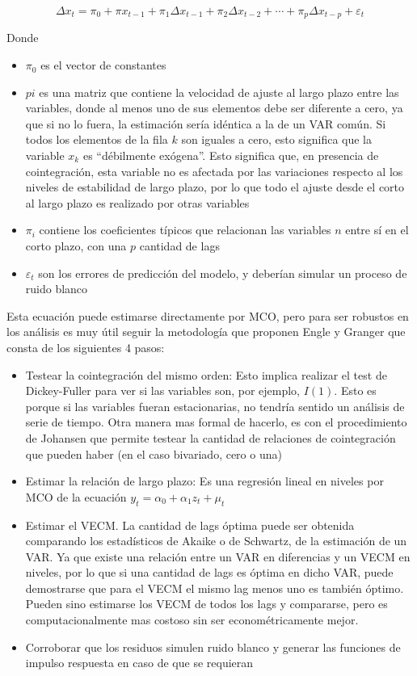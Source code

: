\documentclass[11pt,a4paper]{article}
\begin{document}
$$
\Delta x_{t}=\pi_{0}+\pi x_{t-1}+\pi_{1} \Delta x_{t-1}+\pi_{2} \Delta x_{t-2}+\cdots+\pi_{p} \Delta x_{t-p}+\varepsilon_{t}
$$

Donde 
\begin{itemize}
\item $\pi_{0}$ es el vector de constantes
\item $pi$ es una matriz que contiene la velocidad de ajuste al largo plazo entre las variables, donde al menos uno de sus elementos debe ser diferente a cero, ya que si no lo fuera, la estimación sería idéntica a la de un VAR común. Si todos los elementos de la fila $k$ son iguales a cero, esto significa que la variable $x_k$ es ``débilmente exógena''. Esto significa que, en presencia de cointegración, esta variable no es afectada por las variaciones respecto al los niveles de estabilidad de largo plazo, por lo que todo el ajuste desde el corto al largo plazo es realizado por otras variables 
\item $\pi_{i}$ contiene los coeficientes típicos que relacionan las variables $n $ entre sí en el corto plazo, con una $p$ cantidad de lags 
\item $\varepsilon_{t} $ son los errores de predicción del modelo, y deberían simular un proceso de ruido blanco
\end{itemize}

Esta ecuación puede estimarse directamente por MCO, pero para ser robustos en los análisis es muy útil seguir la metodología que proponen Engle y Granger que consta de los siguientes 4 pasos:
\begin{itemize}
\item Testear la cointegración del mismo orden: Esto implica realizar el test de Dickey-Fuller para ver si las variables son, por ejemplo, $I(1) $. Esto es porque si las variables fueran estacionarias, no tendría sentido un análisis de serie de tiempo. Otra manera mas formal de hacerlo, es con el procedimiento de Johansen que permite testear la cantidad de relaciones de cointegración que pueden haber (en el caso bivariado, cero o una)
\item Estimar la relación de largo plazo: Es una regresión lineal en niveles por MCO de la ecuación $y_t=\alpha_0 +\alpha_1 z_t + \mu_t $
\item Estimar el VECM. La cantidad de lags óptima puede ser obtenida comparando los estadísticos de Akaike o de Schwartz, de la estimación de un VAR. Ya que existe una relación entre un VAR en diferencias y un VECM en niveles, por lo que si una cantidad de lags es óptima en dicho VAR, puede demostrarse que para el VECM el mismo lag menos uno es también óptimo. Pueden sino estimarse los VECM de todos los lags y compararse, pero es computacionalmente mas costoso sin ser econométricamente mejor.  
\item Corroborar que los residuos simulen ruido blanco y generar las funciones de impulso respuesta en caso de que se requieran
\end{itemize}
\end{document}
